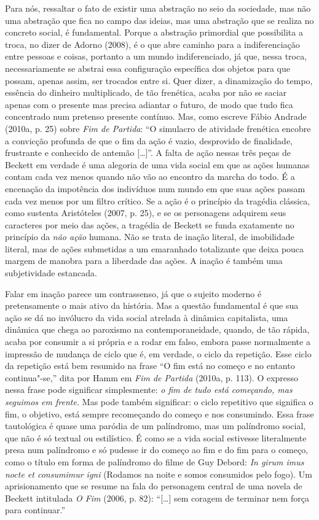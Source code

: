 Para nós, ressaltar o fato de existir uma abstração no seio da
sociedade, mas não uma abstração que fica no campo das ideias, mas uma
abstração que se realiza no concreto social, é fundamental. Porque a
abstração primordial que possibilita a troca, no dizer de Adorno (2008),
é o que abre caminho para a indiferenciação entre pessoas e coisas,
portanto a um mundo indiferenciado, já que, nessa troca, necessariamente
se abstrai essa configuração específica dos objetos para que possam,
apenas assim, ser trocados entre si. Quer dizer, a dinamização do tempo,
essência do dinheiro multiplicado, de tão frenética, acaba por não se
saciar apenas com o presente mas precisa adiantar o futuro, de modo que
tudo fica concentrado num pretenso presente contínuo. Mas, como escreve
Fábio Andrade (2010a, p. 25) sobre \emph{Fim de Partida}: ``O simulacro
de atividade frenética encobre a convicção profunda de que o fim da ação
é vazio, desprovido de finalidade, frustrante e conhecido de antemão
[\ldots{}]''. A falta de ação nessas três peças de Beckett em verdade é
uma alegoria de uma vida social em que as ações humanas contam cada vez
menos quando não vão ao encontro da marcha do todo. É a encenação da
impotência dos indivíduos num mundo em que suas ações passam cada vez
menos por um filtro crítico. Se a ação é o princípio da tragédia
clássica, como sustenta Aristóteles (2007, p. 25), e se os personagens
adquirem seus caracteres por meio das ações, a tragédia de Beckett se
funda exatamente no princípio da \emph{não ação} humana. Não se trata de
inação literal, de imobilidade literal, mas de ações submetidas a um
emaranhado totalizante que deixa pouca margem de manobra para a
liberdade das ações. A inação é também uma subjetividade estancada.

Falar em inação parece um contrassenso, já que o sujeito moderno é
pretensamente o mais ativo da história. Mas a questão fundamental é que
sua ação se dá no invólucro da vida social atrelada à dinâmica
capitalista, uma dinâmica que chega ao paroxismo na contemporaneidade,
quando, de tão rápida, acaba por consumir a si própria e a rodar em
falso, embora passe normalmente a impressão de mudança de ciclo que é,
em verdade, o ciclo da repetição. Esse ciclo da repetição está bem
resumido na frase ``O fim está no começo e no entanto continua"-se,''
dita por Hamm em \emph{Fim de Partida} (2010a, p. 113). O
expresso nessa frase pode significar simplesmente: \emph{o fim de tudo
está começando, mas seguimos em frente.} Mas pode também significar: o
ciclo repetitivo que significa o fim, o objetivo, está sempre
recomeçando do começo e nos consumindo. Essa frase tautológica é quase
uma paródia de um palíndromo, mas um palíndromo social, que não é só
textual ou estilístico. É como se a vida social estivesse literalmente
presa num palíndromo e só pudesse ir do começo ao fim e do fim para o
começo, como o título em forma de palíndromo do filme de Guy Debord:
\emph{In girum imus nocte et consumimur igni} (Rodamos na noite e somos
consumidos pelo fogo). Um aprisionamento que se resume na fala do
personagem central de uma novela de Beckett intitulada \emph{O Fim}
(2006, p. 82): ``[\ldots{}] sem coragem de terminar nem força para
continuar.''

